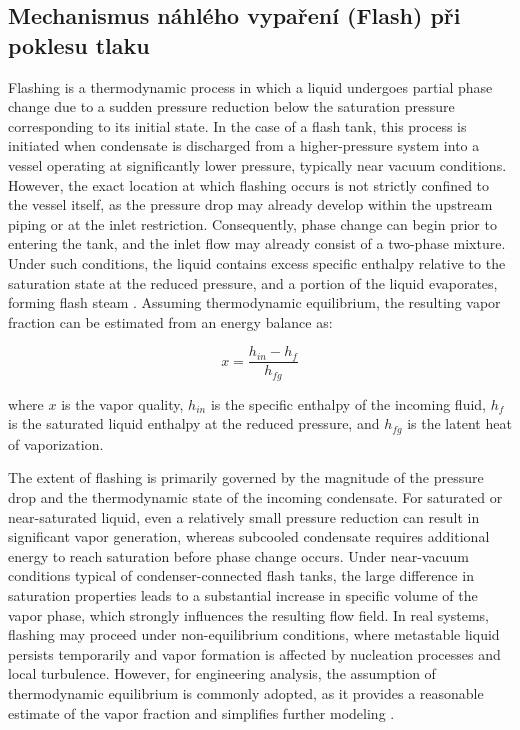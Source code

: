 \subsection{Mechanismus náhlého vypaření (Flash) při poklesu tlaku}

Flashing is a thermodynamic process in which a liquid undergoes partial phase change due to a sudden pressure reduction below the saturation pressure corresponding to its initial state. In the case of a flash tank, this process is initiated when condensate is discharged from a higher-pressure system into a vessel operating at significantly lower pressure, typically near vacuum conditions. However, the exact location at which flashing occurs is not strictly confined to the vessel itself, as the pressure drop may already develop within the upstream piping or at the inlet restriction. Consequently, phase change can begin prior to entering the tank, and the inlet flow may already consist of a two-phase mixture. Under such conditions, the liquid contains excess specific enthalpy relative to the saturation state at the reduced pressure, and a portion of the liquid evaporates, forming flash steam \cite{Moran_Shapiro}. Assuming thermodynamic equilibrium, the resulting vapor fraction can be estimated from an energy balance as:

\begin{equation}
x = \frac{h_{in} - h_f}{h_{fg}}
\end{equation}

where $x$ is the vapor quality, $h_{in}$ is the specific enthalpy of the incoming fluid, $h_f$ is the saturated liquid enthalpy at the reduced pressure, and $h_{fg}$ is the latent heat of vaporization.

The extent of flashing is primarily governed by the magnitude of the pressure drop and the thermodynamic state of the incoming condensate. For saturated or near-saturated liquid, even a relatively small pressure reduction can result in significant vapor generation, whereas subcooled condensate requires additional energy to reach saturation before phase change occurs. Under near-vacuum conditions typical of condenser-connected flash tanks, the large difference in saturation properties leads to a substantial increase in specific volume of the vapor phase, which strongly influences the resulting flow field. In real systems, flashing may proceed under non-equilibrium conditions, where metastable liquid persists temporarily and vapor formation is affected by nucleation processes and local turbulence. However, for engineering analysis, the assumption of thermodynamic equilibrium is commonly adopted, as it provides a reasonable estimate of the vapor fraction and simplifies further modeling \cite{Ishii_Hibiki}.

